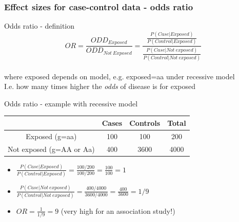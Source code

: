 \documentclass[xcolor=pdftex,dvipsnames,table,10pt]{beamer}
\begin{document}
\begin{frame}
  \frametitle{Effect sizes for case-control data - odds ratio}
  \small
\begin{block}{Odds ratio - definition}
 \[OR =\frac{ODD_{Exposed}}{ODD_{Not\ Exposed}}=\frac{\frac{P(Case|Exposed)}{P(Control|Exposed)}}{\frac{P(Case|Not\ exposed)}{P(Control|Not\ exposed)}} \]\\
 where exposed depends on model, e.g. exposed=aa under recessive model \\
\vspace{0.2cm}I.e. how many times higher the \textit{odds} of disease is for exposed\\\vspace{0.1cm}
\end{block}
\begin{block}{Odds ratio - example with recessive model}
\vspace{0.1cm}
  {   
\scriptsize{
  \begin{table}
\hspace{-2.4cm}    \begin{tabular}{|c|cc|c|}
\hline
      & Cases & Controls & Total \\
\hline
Exposed (g=aa) & 100 & 100 & 200\\
Not exposed (g=AA or Aa) & 400 & 3600 & 4000\\
 \hline   \end{tabular}
      \end{table}
}
}
\vspace{-0.3cm}
\begin{itemize}
\item $\frac{P(Case|Exposed)}{P(Control|Exposed)} = \frac{100/200}{100/200}=  \frac{100}{100}=1$
\item $\frac{P(Case|Not\ exposed)}{P(Control|Not\ exposed)} = \frac{400/4000}{3600/4000}= \frac{400}{3600}=1/9$
\item $OR = \frac{1}{1/9} = 9$ (very high for an association study!)
\end{itemize}
\end{block}
\end{frame}
\end{document}
